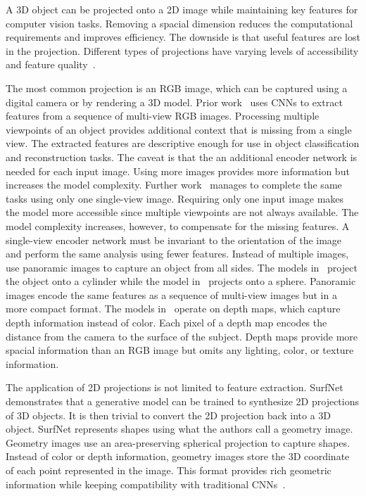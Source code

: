 A 3D object can be projected onto a 2D image while maintaining key features for computer vision tasks. Removing a spacial dimension reduces the computational requirements and improves efficiency. The downside is that useful features are lost in the projection. Different types of projections have varying levels of accessibility and feature quality~\cite{Ahmed2018}.

The most common projection is an RGB image, which can be captured using a digital camera or by rendering a 3D model. Prior work~\cite{Zhu2014, Su2015, Choy2016, Smith2018} uses CNNs to extract features from a sequence of multi-view RGB images. Processing multiple viewpoints of an object provides additional context that is missing from a single view. The extracted features are descriptive enough for use in object classification and reconstruction tasks. The caveat is that the an additional encoder network is needed for each input image. Using more images provides more information but increases the model complexity. Further work~\cite{Fan2017, Wang2018, Niu2018, Genova2020, Pan2019} manages to complete the same tasks using only one single-view image. Requiring only one input image makes the model more accessible since multiple viewpoints are not always available. The model complexity increases, however, to compensate for the missing features. A single-view encoder network must be invariant to the orientation of the image and perform the same analysis using fewer features. Instead of multiple images, \cite{Shi2015, Sfikas2017, Cao2017} use panoramic images to capture an object from all sides. The models in~\cite{Shi2015, Sfikas2017} project the object onto a cylinder while the model in~\cite{Cao2017} projects onto a sphere. Panoramic images encode the same features as a sequence of multi-view images but in a more compact format. The models in~\cite{Zhu2014, Genova2020, Shi2015, Sfikas2017, Cao2017} operate on depth maps, which capture depth information instead of color. Each pixel of a depth map encodes the distance from the camera to the surface of the subject. Depth maps provide more spacial information than an RGB image but omits any lighting, color, or texture information.

The application of 2D projections is not limited to feature extraction. SurfNet~\cite{Sinha2017} demonstrates that a generative model can be trained to synthesize 2D projections of 3D objects. It is then trivial to convert the 2D projection back into a 3D object. SurfNet represents shapes using what the authors call a geometry image. Geometry images use an area-preserving spherical projection to capture shapes. Instead of color or depth information, geometry images store the 3D coordinate of each point represented in the image. This format provides rich geometric information while keeping compatibility with traditional CNNs~\cite{Sinha2017}.

